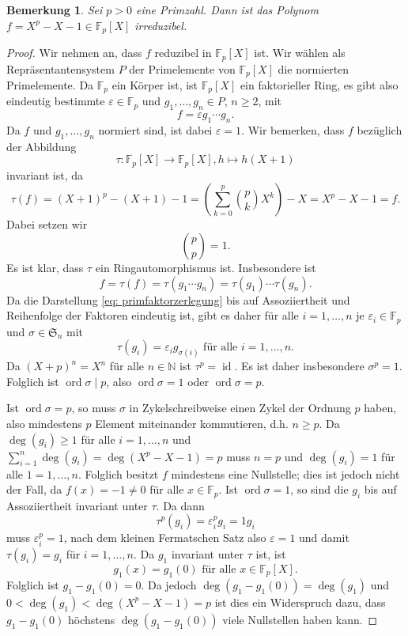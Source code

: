 \documentclass[a4paper,10pt]{article}
\newcounter{satze}
\newtheorem{bem}[satze]{Bemerkung}
\theoremstyle{definition}
\newcommand{\N}{\mathbb{N}}
\newcommand{\mf}[1]{\mathfrak{#1}}
\newcommand{\F}{\mathbb{F}}
\newcommand{\id}{\operatorname{id}}
\newcommand{\ord}{\operatorname{ord}}
\begin{document}
\begin{bem}
 Sei $p > 0$ eine Primzahl. Dann ist das Polynom $f = X^p -X -1 \in \F_p[X]$ irreduzibel.
\end{bem}
\begin{proof}
 Wir nehmen an, dass $f$ reduzibel in $\F_p[X]$ ist. Wir wählen als Repräsentantensystem $P$ der Primelemente von $\F_p[X]$ die normierten Primelemente. Da $\F_p$ ein Körper ist, ist $\F_p[X]$ ein faktorieller Ring, es gibt also eindeutig bestimmte $\varepsilon \in \F_p$ und $g_1, \ldots, g_n \in P$, $n \geq 2$, mit
 \begin{equation}\label{eq: primfaktorzerlegung}
  f = \varepsilon g_1 \cdots g_n.
 \end{equation}
 Da $f$ und $g_1, \ldots, g_n$ normiert sind, ist dabei $\varepsilon = 1$.
 Wir bemerken, dass $f$ bezüglich der Abbildung
 \[
  \tau : \F_p[X] \rightarrow \F_p[X], h \mapsto h(X+1)
 \]
 invariant ist, da
 \[
  \tau(f)
  = (X+1)^p -(X+1) -1
  = \left( \sum_{k=0}^p \binom{p}{k} X^k \right) -X
  = X^p -X -1
  = f.
 \]
 Dabei setzen wir
 \[
  \binom{p}{p} = 1.
 \]
 Es ist klar, dass $\tau$ ein Ringautomorphismus ist. Insbesondere ist
 \[
  f = \tau(f) = \tau(g_1 \cdots g_n) = \tau(g_1) \cdots \tau(g_n).
 \]
 Da die Darstellung \eqref{eq: primfaktorzerlegung} bis auf Assoziiertheit und Reihenfolge der Faktoren eindeutig ist, gibt es daher für alle $i=1,\ldots,n$ je $\varepsilon_i \in \F_p$ und $\sigma \in \mf{S}_n$ mit
 \[
  \tau(g_i) = \varepsilon_i g_{\sigma(i)} \text{ für alle } i=1,\ldots,n.
 \]
 Da $(X+p)^n = X^n$ für alle $n \in \N$ ist $\tau^p = \id$. Es ist daher insbesondere $\sigma^p = 1$. Folglich ist $\ord \sigma \mid p$, also $\ord \sigma = 1$ oder $\ord \sigma = p$.
 
 Ist $\ord \sigma = p$, so muss $\sigma$ in Zykelschreibweise einen Zykel der Ordnung $p$ haben, also mindestens $p$ Element miteinander kommutieren, d.h. $n \geq p$. Da $\deg(g_i) \geq 1$ für alle $i=1,\ldots,n$ und $\sum_{i=1}^n \deg(g_i) = \deg(X^p-X-1) = p$ muss $n=p$ und $\deg(g_i) = 1$ für alle $1=1,\ldots,n$. Folglich besitzt $f$ mindestens eine Nullstelle; dies ist jedoch nicht der Fall, da $f(x) = -1 \neq 0$ für alle $x \in \F_p$.
 Ist $\ord \sigma = 1$, so sind die $g_i$ bis auf Assoziiertheit invariant unter $\tau$. Da dann
 \[
  \tau^p(g_i) = \varepsilon_i^p g_i = 1 g_i
 \]
 muss $\varepsilon_i^p = 1$, nach dem kleinen Fermatschen Satz also $\varepsilon = 1$ und damit $\tau(g_i) = g_i$ für $i=1,\ldots,n$. Da $g_1$ invariant unter $\tau$ ist, ist
 \[
  g_1(x) = g_1(0) \text{ für alle } x \in \F_p[X].
 \]
 Folglich ist $g_1-g_1(0) = 0$. Da jedoch $\deg(g_1-g_1(0)) = \deg(g_1)$ und $0 < \deg(g_1) < \deg(X^p-X-1)=p$ ist dies ein Widerspruch dazu, dass $g_1-g_1(0)$ höchstens $\deg(g_1-g_1(0))$ viele Nullstellen haben kann.
\end{proof}
\end{document}
